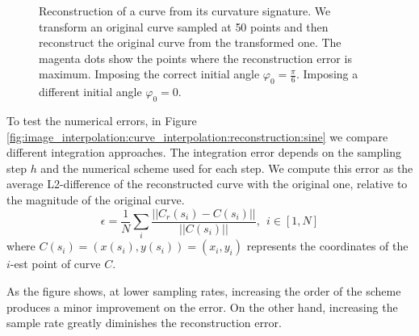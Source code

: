 \documentclass{ipol}
\newcommand{\chapFiveDir}{images/chapter_05a}
\begin{document}
\begin{figure}[h]
	\centering
	
	\caption{Reconstruction of a curve from its curvature signature. We transform an original curve sampled at 50 points and then reconstruct the original curve from the transformed one. The magenta dots show the points where the reconstruction error is maximum.
		\protect{} Imposing the correct initial angle $\varphi_0=\frac{\pi}{6}$.
		\protect{} Imposing a different initial angle $\varphi_0=0$.}
	\label{fig:image_interpolation:curve_interpolation:reconstruction:sine:initial}
\end{figure}

To test the numerical errors, in Figure \ref{fig:image_interpolation:curve_interpolation:reconstruction:sine} we compare different integration approaches. The integration error depends on the sampling step $h$ and the numerical scheme used for each step. We compute this error as the average L2-difference of the reconstructed curve  with the original one, relative to the magnitude of the original curve.
\begin{equation}
 \epsilon=\frac{1}{N}\sum_i\frac{||C_r(s_i)-C(s_i)||}{||C(s_i)||}, \:\: i\in[1,N]
\end{equation}
where $C(s_i)=(x(s_i),y(s_i))=(x_i,y_i)$ represents the coordinates of the $i$-est point of curve $C$.

As the figure shows, at lower sampling rates, increasing the order of the scheme produces a minor improvement on the error. On the other hand, increasing the sample rate greatly diminishes the reconstruction error.
\end{document}
